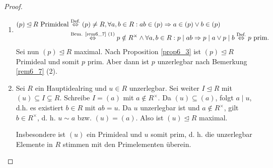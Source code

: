 \begin{proof}
	\begin{enumerate}[label=(\alph*)]
		\item 
		\begin{align*}
			(p) \unlhd R \text{ Primideal} &\overset{\text{Def.}}{\Leftrightarrow} (p) \neq R, \forall a,b\in R: ab \in (p) \Rightarrow a \in (p) \lor b \in (p)\\
			&\overset{\text{Bem. \ref{rem6_7} (1)}}{\Leftrightarrow} p \notin R^\times \land \forall  a,b \in R: p \mid ab \Rightarrow p \mid a \lor p \mid b \overset{\text{Def.}}{\Leftrightarrow} p \text{ prim}.
		\end{align*}
		Sei nun $(p) \unlhd R$ maximal. Nach Proposition \ref{prop6_3} ist $(p) \unlhd R$ Primideal und somit $p$ prim. Aber dann ist $p$ unzerlegbar nach Bemerkung \ref{rem6_7} (2).
		\item Sei $R$ ein Hauptidealring und $u \in R$ unzerlegbar. Sei weiter $I \unlhd R$ mit $(u) \subseteq I \subsetneq  R$. Schreibe $I = (a)$ mit $a \notin R^\times$. Da $(u) \subseteq (a)$, folgt $a \mid u$, d.h. es existiert $b \in R$ mit $ab = u$. Da $u$ unzerlegbar ist und $a \notin R^\times$, gilt $b \in R^\times$, d. h. $u \sim a$ bzw. $(u) = (a)$. Also ist $(u) \unlhd R$ maximal.
		
		Insbesondere ist $(u)$ ein Primideal und $u$ somit prim, d. h. die unzerlegbar Elemente in $R$ stimmen mit den Primelementen überein.
	\end{enumerate}
\end{proof}
